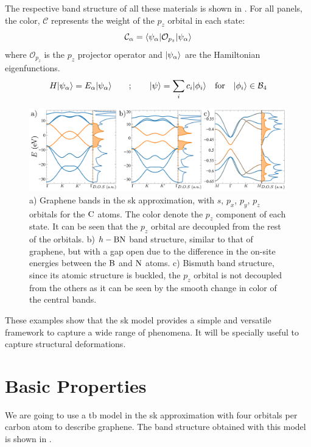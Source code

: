The respective band structure of all these materials is shown in .
For all panels, the color, $\mathcal{C}$ represents the weight of the $p_z$ orbital in each state:
\begin{equation*}
   \mathcal{C}_\alpha = \langle\psi_{\alpha}|\mathcal{O}_{p_z}|\psi_{\alpha}\rangle
\end{equation*}
where $\mathcal{O}_{p_z}$ is the $p_z$ projector operator and $|\psi_{\alpha}\rangle$ are the Hamiltonian eigenfunctions.
\begin{equation*}
  H|\psi_{\alpha}\rangle = E_{\alpha}|\psi_{\alpha}\rangle \qquad ; \qquad
   |\psi\rangle = \sum_i c_i|\phi_i\rangle \quad
   \text{for} \quad|\phi_i\rangle\in\mathcal{B}_4
\end{equation*}
\begin{figure}[!ht]
\centering
\includegraphics{graphene/figures/banddos.pdf}
\vspace{-15pt}
\caption{a) Graphene bands in the \ac{sk} approximation, with $s$, $p_x$, $p_y$, $p_z$ orbitals for the $\ce{C}$ atoms. The color denote the $p_z$ component of each state. It can be seen that the $p_z$ orbital are decoupled from the rest of the orbitals. b) $h-\ce{BN}$ band structure, similar to that of graphene, but with a gap open due to the difference in the on-site energies between the $\ce{B}$ and $\ce{N}$ atoms. c) Bismuth band structure, since its atomic structure is buckled, the $p_z$ orbital is not decoupled from the others as it can be seen by the smooth change in color of the central bands.}
\label{SKbands}
\end{figure}
\FloatBarrier

These examples show that the \ac{sk} model provides a simple and versatile framework to capture a wide range of phenomena. It will be specially useful to capture structural deformations.


\section{Basic Properties}
\label{sec:graphene_basic_properties}
%
%
We are going to use a \ac{tb} model in the \ac{sk} approximation with four orbitals per carbon atom to describe graphene. The band structure obtained with this model is shown in .

